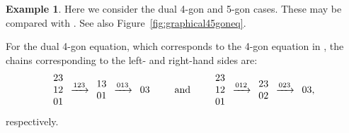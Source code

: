 \documentclass[10pt,a4paper]{amsart}
\numberwithin{equation}{section}
\theoremstyle{definition}
\newtheorem{Example}[Theorem]{Example}
\begin{document}
\begin{Example}
 Here we consider the dual 4-gon and 5-gon cases. These may be compared with \cite[Section~4.2]{dimakis2015simplex}. See also Figure~\ref{fig:graphical45goneq}.

 For the dual 4-gon equation, which corresponds to the 4-gon equation in \cite{dimakis2015simplex}, the chains corresponding to the left- and right-hand sides are:
 \begin{equation*}
 \begin{array}{@{}c@{\;}c@{\;}c@{\;}c@{\;}c}
 \begin{array}{c}
 23\\
 12\\
 01
 \end{array}
 &
 \xrightarrow{123}
 &
 \begin{array}{c}
 13\\
 01
 \end{array}
 &
 \xrightarrow{013}
 &
 \begin{array}{c@{}}
 03
 \end{array}
 \end{array}
 \qquad\text{and}\qquad
 \begin{array}{@{}c@{\;}c@{\;}c@{\;}c@{\;}c}
 \begin{array}{c}
 23\\
 12\\
 01
 \end{array}
 &
 \xrightarrow{012}
 &
 \begin{array}{c}
 23\\
 02
 \end{array}
 &
 \xrightarrow{023}
 &
 \begin{array}{c@{}}
 03
 \end{array},
 \end{array}
 \end{equation*}
 respectively.


\end{Example}
\end{document}
